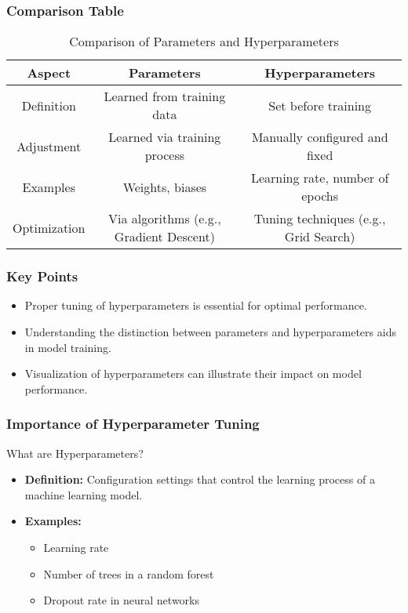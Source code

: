 \documentclass[aspectratio=169]{beamer}
\begin{document}
\begin{frame}[fragile]
    \frametitle{Comparison Table}
    \begin{table}[ht]
        \centering
        \begin{tabular}{|c|c|c|}
            \hline
            \textbf{Aspect} & \textbf{Parameters} & \textbf{Hyperparameters} \\ \hline
            Definition & Learned from training data & Set before training \\ \hline
            Adjustment & Learned via training process & Manually configured and fixed \\ \hline
            Examples & Weights, biases & Learning rate, number of epochs \\ \hline
            Optimization & Via algorithms (e.g., Gradient Descent) & Tuning techniques (e.g., Grid Search) \\ \hline
        \end{tabular}
        \caption{Comparison of Parameters and Hyperparameters}
    \end{table}
\end{frame}

\begin{frame}[fragile]
    \frametitle{Key Points}
    \begin{itemize}
        \item Proper tuning of hyperparameters is essential for optimal performance.
        \item Understanding the distinction between parameters and hyperparameters aids in model training.
        \item Visualization of hyperparameters can illustrate their impact on model performance.
    \end{itemize}
\end{frame}

\begin{frame}[fragile]
    \frametitle{Importance of Hyperparameter Tuning}
    \begin{block}{What are Hyperparameters?}
        \begin{itemize}
            \item \textbf{Definition:} Configuration settings that control the learning process of a machine learning model.
            \item \textbf{Examples:} 
            \begin{itemize}
                \item Learning rate
                \item Number of trees in a random forest
                \item Dropout rate in neural networks
            \end{itemize}
        \end{itemize}
    \end{block}
\end{frame}
\end{document}
